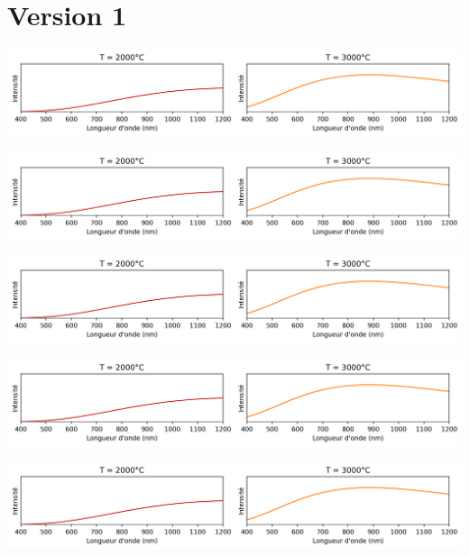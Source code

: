 \documentclass[12pt,a4paper,fleqn]{article}
\begin{document}
\section*{Version 1}

\begin{center}
\includegraphics[width=\linewidth]{images/spectrum_black_body_curve3273K.png}
\end{center}

\begin{center}
\includegraphics[width=\linewidth]{images/spectrum_black_body_curve3273K.png}
\end{center}

\begin{center}
\includegraphics[width=\linewidth]{images/spectrum_black_body_curve3273K.png}
\end{center}

\begin{center}
\includegraphics[width=\linewidth]{images/spectrum_black_body_curve3273K.png}
\end{center}

\begin{center}
\includegraphics[width=\linewidth]{images/spectrum_black_body_curve3273K.png}
\end{center}
\end{document}

